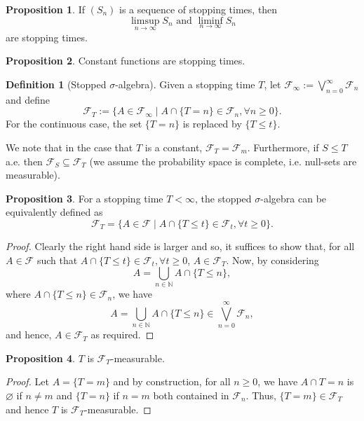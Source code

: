 \documentclass[]{article}
\theoremstyle{definition}
\theoremstyle{definition}
\newtheorem{definition}{Definition}[section]
\newtheorem{proposition}{Proposition}[section]
\begin{document}
\begin{proposition}
  If \((S_n)\) is a sequence of stopping times, then 
  \[\limsup_{n \to \infty} S_n \text{ and } \liminf_{n \to \infty} S_n\]
  are stopping times.
\end{proposition}

\begin{proposition}
  Constant functions are stopping times.
\end{proposition}

\begin{definition}[Stopped \(\sigma\)-algebra]
  Given a stopping time \(T\), let \(\mathcal{F}_\infty := \bigvee_{n = 0}^\infty \mathcal{F}_n\) 
  and define 
  \[\mathcal{F}_T := \{A \in \mathcal{F}_\infty \mid A \cap \{T = n\} \in \mathcal{F}_n, \forall n \ge 0\}.\]
  For the continuous case, the set \(\{T = n\}\) is replaced by \(\{T \le t\}\).
\end{definition}

We note that in the case that \(T\) is a constant, \(\mathcal{F}_T = \mathcal{F}_m\).
Furthermore, if \(S \le T\) a.e. then \(\mathcal{F}_S \subseteq \mathcal{F}_T\) 
(we assume the probability space is complete, i.e. null-sets are measurable).

\begin{proposition}
  For a stopping time \(T < \infty\), the stopped \(\sigma\)-algebra can be 
  equivalently defined as
  \[\mathcal{F}_T = \{A \in \mathcal{F} \mid A \cap \{T \le t\} \in \mathcal{F}_t, \forall t \ge 0\}.\]
\end{proposition}
\begin{proof}
  Clearly the right hand side is larger and so, it suffices to show that, for all 
  \(A \in \mathcal{F}\) such that \(A \cap \{T \le t\} \in \mathcal{F}_t, \forall t \ge 0\),
  \(A \in \mathcal{F}_T\). Now, by considering 
  \[A = \bigcup_{n \in \mathbb{N}} A \cap \{T \le n\},\]
  where \(A \cap \{T \le n\} \in \mathcal{F}_n\), we have 
  \[A = \bigcup_{n \in \mathbb{N}} A \cap \{T \le n\} \in \bigvee_{n = 0}^\infty \mathcal{F}_n,\]
  and hence, \(A \in \mathcal{F}_T\) as required.
\end{proof}

\begin{proposition}
  \(T\) is \(\mathcal{F}_T\)-measurable.
\end{proposition}
\begin{proof}
  Let \(A = \{T = m\}\) and by construction, for all \(n \ge 0\), we have 
  \(A \cap {T = n}\) is \(\varnothing\) if \(n \neq m\) and \(\{T = n\}\) if 
  \(n = m\) both contained in \(\mathcal{F}_n\). Thus, \(\{T = m\} \in \mathcal{F}_T\) 
  and hence \(T\) is \(\mathcal{F}_T\)-measurable.
\end{proof}
\end{document}
